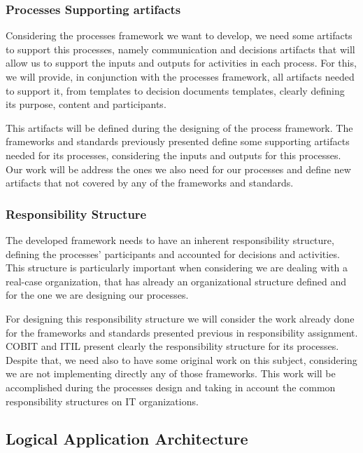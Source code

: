 \subsubsection{Processes Supporting artifacts}

Considering the processes framework we want to develop, we need some artifacts to support this processes, namely communication and decisions artifacts that will allow us to support the inputs and outputs for activities in each process. For this, we will provide, in conjunction with the processes framework, all artifacts needed to support it, from templates to decision documents templates, clearly defining its purpose, content and participants.\par
This artifacts will be defined during the designing of the process framework. The frameworks and standards previously presented define some supporting artifacts needed for its processes, considering the inputs and outputs for this processes. Our work will be address the ones we also need for our processes and define new artifacts that not covered by any of the frameworks and standards.\par

\subsubsection{Responsibility Structure}

The developed framework needs to have an inherent responsibility structure, defining the processes' participants and accounted for decisions and activities. This structure is particularly important when considering we are dealing with a real-case organization, that has already an organizational structure defined and for the one we are designing our processes.\par
For designing this responsibility structure we will consider the work already done for the frameworks and standards presented previous in responsibility assignment. COBIT and ITIL present clearly the responsibility structure for its processes. Despite that, we need also to have some original work on this subject, considering we are not implementing directly any of those frameworks. This work will be accomplished during the processes design and taking in account the common responsibility structures on IT organizations.\par 

\subsection{Logical Application Architecture}


